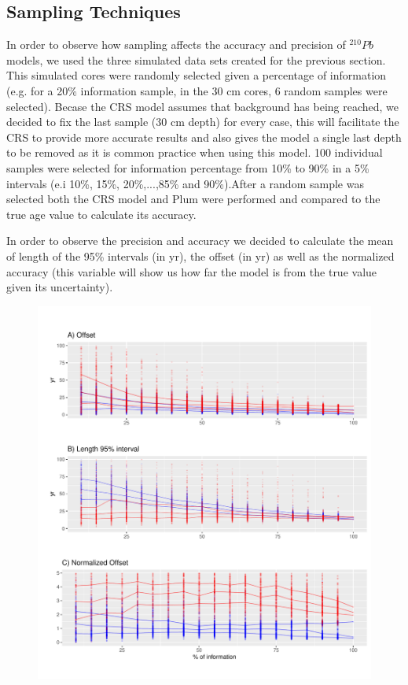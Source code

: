 \documentclass [11pt] {article}
\begin{document}
\subsection{Sampling Techniques }

In order to observe how sampling affects the accuracy and precision of $^{210}Pb$ models, we used the three simulated data sets created for the previous section. This simulated cores were randomly selected given a percentage of information (e.g. for a 20\% information sample, in the 30 cm cores, 6 random samples were selected). Becase the CRS model assumes that background has being reached, we decided to fix the last sample (30 cm depth) for every case, this will facilitate the CRS to provide more accurate results and also gives the model a single last depth to be removed as it is common practice when using this model. 100 individual samples were selected for information percentage from 10\% to 90\% in a 5\% intervals (e.i 10\%, 15\%, 20\%,...,85\% and 90\%).After a random sample was selected both the CRS model and Plum were performed and compared to the true age value to calculate its accuracy. 

In order to observe the precision and accuracy we decided to calculate the mean of length of the 95\% intervals (in yr), the offset (in yr) as well as the normalized accuracy (this variable will show us how far the model is from the true value given its uncertainty).  


\begin{figure}
 \centering
  \includegraphics[width=\linewidth]{AccPrec.pdf}
  \caption{}
  \label{fig:accpre}
\end{figure}
\end{document}
